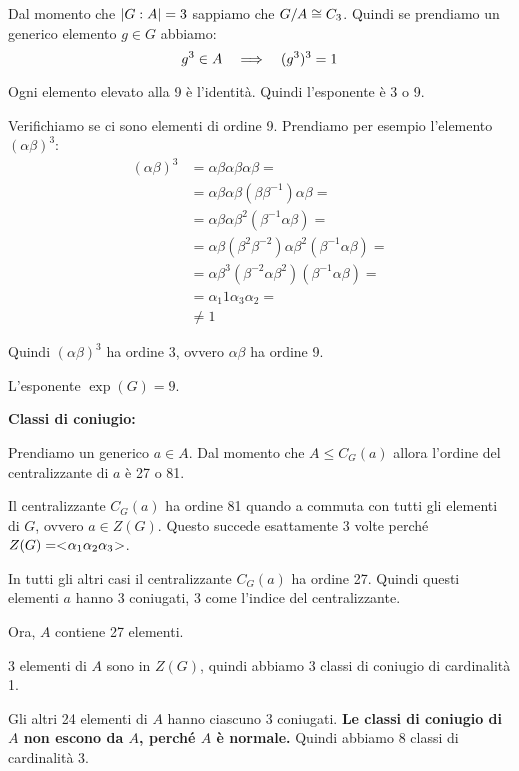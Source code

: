 \begin{soluzione}
    Dal momento che $\lvert G:A \rvert = 3$ sappiamo che $G/A \cong C_3$.
    Quindi se prendiamo un generico elemento $g \in G$ abbiamo:
    \begin{equation*}
        g^3 \in A \quad\Longrightarrow\quad (g^3)^3 = 1
    \end{equation*}

    Ogni elemento elevato alla 9 è l'identità.
    Quindi l'esponente è 3 o 9.

    Verifichiamo se ci sono elementi di ordine 9.
    Prendiamo per esempio l'elemento $(\alpha\beta)^3$:
    \begin{align*}
    (\alpha\beta)^3 &= \alpha\beta \alpha\beta \alpha\beta = \\
        &= \alpha\beta \alpha\beta (\beta \beta^{-1}) \alpha\beta = \\
        &= \alpha\beta \alpha\beta^2(\beta^{-1} \alpha\beta) = \\
        &= \alpha\beta (\beta^2\beta^{-2}) \alpha \beta^2(\beta^{-1} \alpha\beta) = \\
        &= \alpha\beta^3(\beta^{-2} \alpha \beta^2)(\beta^{-1} \alpha\beta) = \\
        &= \alpha_1 1 \alpha_3 \alpha_2 = \\
        &\ne 1
    \end{align*}

    Quindi $(\alpha\beta)^3$ ha ordine 3, ovvero $\alpha\beta$ ha ordine 9.

    L'esponente $\exp(G) = 9$.

    \bigskip
    \textbf{Classi di coniugio:}

    Prendiamo un generico $a \in A$.
    Dal momento che $A \le C_G(a)$ allora l'ordine del centralizzante di $a$ è 27 o 81.

    Il centralizzante $C_G(a)$ ha ordine 81 quando a commuta con tutti gli elementi di $G$, ovvero $a \in Z(G)$.
    Questo succede esattamente 3 volte perché $Z(G) = < \negmedspace \alpha_1\alpha_2\alpha_3 \negmedspace >$.

    In tutti gli altri casi il centralizzante $C_G(a)$ ha ordine 27.
    Quindi questi elementi $a$ hanno 3 coniugati, 3 come l'indice del centralizzante.

    Ora, $A$ contiene 27 elementi.

    3 elementi di $A$ sono in $Z(G)$, quindi abbiamo 3 classi di coniugio di cardinalità 1.

    Gli altri 24 elementi di $A$ hanno ciascuno 3 coniugati.
    \textbf{Le classi di coniugio di $A$ non escono da $A$, perché $A$ è normale.}
    Quindi abbiamo 8 classi di cardinalità 3.


\end{soluzione}
